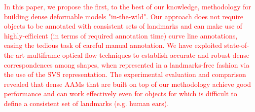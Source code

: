 \textcolor{red}{In this paper, we propose the first, to the best of our knowledge, methodology for building dense deformable models "in-the-wild". Our approach does not require objects to be annotated with consistent sets of landmarks and can make use of highly-efficient (in terms of required annotation time) curve line annotations, easing the tedious task of careful manual annotation. We have exploited state-of-the-art multiframe optical flow techniques to establish accurate and robust dense correspondences among shapes, when represented in a landmarks-free fashion via the use of the SVS representation. The experimental evaluation and comparison revealed that dense AAMs that are built on top of our methodology achieve good performance and can work effectively even for objects for which is difficult to define a consistent set of landmarks (e.g. human ears).}